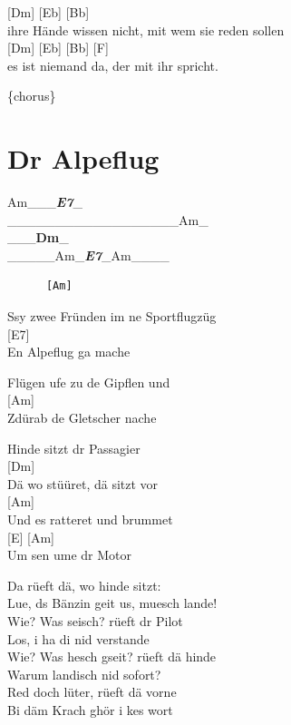 \documentclass[
  letterpaper,
]{scrbook}
\begin{document}
{[}Dm{]} {[}Eb{]} {[}Bb{]}\\
ihre Hände wissen nicht, mit wem sie reden sollen\\
{[}Dm{]} {[}Eb{]} {[}Bb{]} {[}F{]}\\
es ist niemand da, der mit ihr spricht.

\{chorus\}

\hypertarget{dr-alpeflug}{%
\chapter{Dr Alpeflug}\label{dr-alpeflug}}

Am\_\textbf{\emph{\textbar{}}}\_\textbf{\textbar{}}\_\textbf{\emph{\textbar E7}}\_\textbar{}\\
\_\_\_\_\_\_\textbar\_\_\_\_\_\_\textbar\_\_\_\_\_\_\textbar Am\_\textbf{\emph{\textbar{}\\
}}\_\textbf{\textbar{}}\_\textbf{\emph{\textbar{}}}\_\textbf{\textbar Dm}\_\emph{\textbar{}\\
}\_\_\_\_\_\textbar Am\_\textbf{\emph{\textbar E7}}\_\textbar Am\_\_\_\_\textbar{}

\begin{verbatim}
      [Am]
\end{verbatim}

S\textquotesingle sy zwee Fründen im ne Sportflugzüg\\
{[}E7{]}\\
En Alpeflug ga mache

Flügen ufe zu de Gipflen und\\
{[}Am{]}\\
Z\textquotesingle dürab de Gletscher nache

Hinde sitzt dr Passagier\\
{[}Dm{]}\\
Dä wo stüüret, dä sitzt vor\\
{[}Am{]}\\
Und es ratteret und brummet\\
{[}E{]} {[}Am{]}\\
Um sen ume dr Motor

Da rüeft dä, wo hinde sitzt:\\
Lue, ds Bänzin geit us, muesch lande!\\
Wie? Was seisch? rüeft dr Pilot\\
Los, i ha di nid verstande\\
Wie? Was hesch gseit? rüeft dä hinde\\
Warum landisch nid sofort?\\
Red doch lüter, rüeft dä vorne\\
Bi däm Krach ghör i kes wort
\end{document}
